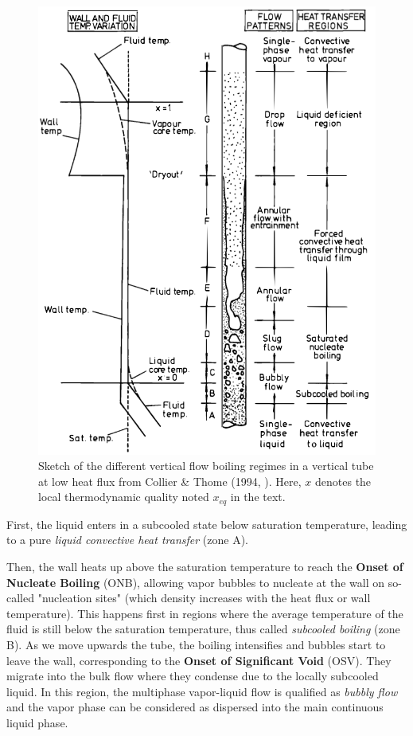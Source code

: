 \begin{figure}[!h]
\centering
\includegraphics[width=0.6\linewidth]{img/intro/boiling_collier.png}
\caption{Sketch of the different vertical flow boiling regimes in a vertical tube at low heat flux from Collier \& Thome (1994, \cite{collier_convective_1994}). Here, $x$ denotes the local thermodynamic quality noted $x_{eq}$ in the text. }
\label{fig:boiling_collier}
\end{figure}


\npar


First, the liquid enters in a subcooled state \ie below saturation temperature, leading to a pure \textit{liquid convective heat transfer} (zone A).

\npar

Then, the wall heats up above the saturation temperature to reach the \textbf{Onset of Nucleate Boiling} (ONB), allowing vapor bubbles to nucleate at the wall on so-called "nucleation sites" (which density increases with the heat flux or wall temperature). This happens first in regions where the average temperature of the fluid is still below the saturation temperature, thus called \textit{subcooled boiling} (zone B). As we move upwards the tube, the boiling intensifies and bubbles start to leave the wall, corresponding to the \textbf{Onset of Significant Void} (OSV). They migrate into the bulk flow where they condense due to the locally subcooled liquid. In this region, the multiphase vapor-liquid flow is qualified as \textit{bubbly flow} and the vapor phase can be considered as dispersed into the main continuous liquid phase.

